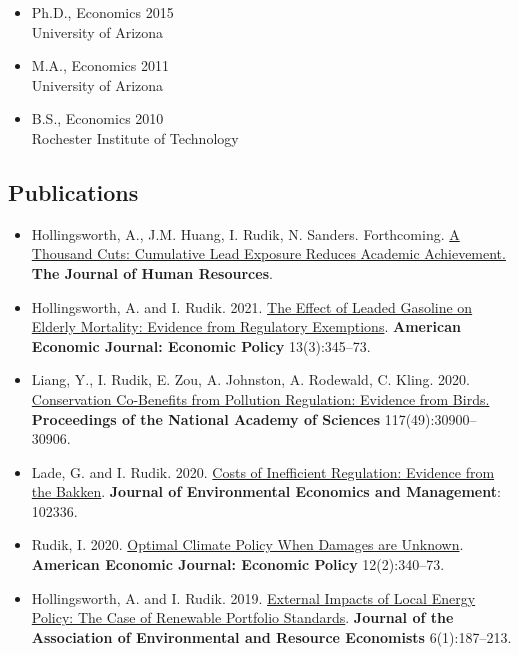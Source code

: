 \documentclass[12pt]{res} %
\begin{document}
\begin{resume}
	\begin{itemize}
		\item[] Ph.D., Economics \hfill 2015\\
		University of Arizona

		\item[] M.A., Economics \hfill 2011\\
		University of Arizona

		\item[] B.S.,  Economics \hfill 2010\\
		Rochester Institute of Technology

	\end{itemize}
\vspace{-.2in}
\subsection{Publications}
\begin{itemize}
	\item[] Hollingsworth, A., J.M. Huang, I. Rudik, N. Sanders. Forthcoming. \href{https://www.nber.org/papers/w28250}{A Thousand Cuts: Cumulative Lead Exposure Reduces Academic Achievement.} \textbf{The Journal of Human Resources}.
	\item[] Hollingsworth, A. and I. Rudik. 2021. \href{https://osf.io/preprints/socarxiv/rdy6g}{The Effect of Leaded Gasoline on Elderly Mortality: Evidence from Regulatory Exemptions}. \textbf{American Economic Journal: Economic Policy} 13(3):345--73.
	\item[] Liang, Y., I. Rudik, E. Zou, A. Johnston, A. Rodewald, C. Kling. 2020. \href{https://www.pnas.org/content/early/2020/11/23/2013568117}{Conservation Co-Benefits from Pollution Regulation: Evidence from Birds.} \textbf{Proceedings of the National Academy of Sciences} 117(49):30900--30906.
	\item[] Lade, G. and I. Rudik. 2020. \href{https://papers.ssrn.com/sol3/papers.cfm?abstract_id=3086728}{Costs of Inefficient Regulation: Evidence from the Bakken}. \textbf{Journal of Environmental Economics and Management}: 102336.
	\item[] Rudik, I. 2020. \href{https://www.aeaweb.org/articles?id=10.1257/pol.20160541}{Optimal Climate Policy When Damages are Unknown}. \textbf{American Economic Journal: Economic Policy} 12(2):340--73.
	\item[] Hollingsworth, A. and I. Rudik. 2019. \href{http://papers.ssrn.com/sol3/papers.cfm?abstract_id=2697222}{External Impacts of Local Energy Policy: The Case of Renewable Portfolio Standards}. \textbf{Journal of the Association of Environmental and Resource Economists} 6(1):187--213.

\end{itemize}
\end{resume}
\end{document}

